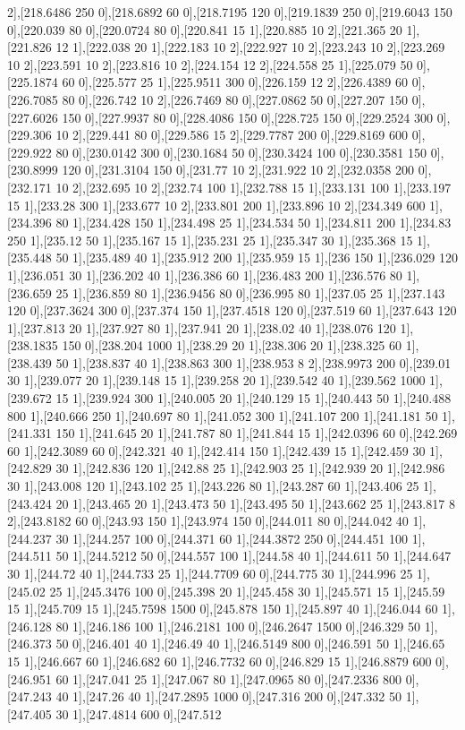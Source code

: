 {2],[218.6486 250 0],[218.6892 60 0],[218.7195 120 0],[219.1839 250 0],[219.6043 150 0],[220.039 80 0],[220.0724 80 0],[220.841 15 1],[220.885 10 2],[221.365 20 1],[221.826 12 1],[222.038 20 1],[222.183 10 2],[222.927 10 2],[223.243 10 2],[223.269 10 2],[223.591 10 2],[223.816 10 2],[224.154 12 2],[224.558 25 1],[225.079 50 0],[225.1874 60 0],[225.577 25 1],[225.9511 300 0],[226.159 12 2],[226.4389 60 0],[226.7085 80 0],[226.742 10 2],[226.7469 80 0],[227.0862 50 0],[227.207 150 0],[227.6026 150 0],[227.9937 80 0],[228.4086 150 0],[228.725 150 0],[229.2524 300 0],[229.306 10 2],[229.441 80 0],[229.586 15 2],[229.7787 200 0],[229.8169 600 0],[229.922 80 0],[230.0142 300 0],[230.1684 50 0],[230.3424 100 0],[230.3581 150 0],[230.8999 120 0],[231.3104 150 0],[231.77 10 2],[231.922 10 2],[232.0358 200 0],[232.171 10 2],[232.695 10 2],[232.74 100 1],[232.788 15 1],[233.131 100 1],[233.197 15 1],[233.28 300 1],[233.677 10 2],[233.801 200 1],[233.896 10 2],[234.349 600 1],[234.396 80 1],[234.428 150 1],[234.498 25 1],[234.534 50 1],[234.811 200 1],[234.83 250 1],[235.12 50 1],[235.167 15 1],[235.231 25 1],[235.347 30 1],[235.368 15 1],[235.448 50 1],[235.489 40 1],[235.912 200 1],[235.959 15 1],[236 150 1],[236.029 120 1],[236.051 30 1],[236.202 40 1],[236.386 60 1],[236.483 200 1],[236.576 80 1],[236.659 25 1],[236.859 80 1],[236.9456 80 0],[236.995 80 1],[237.05 25 1],[237.143 120 0],[237.3624 300 0],[237.374 150 1],[237.4518 120 0],[237.519 60 1],[237.643 120 1],[237.813 20 1],[237.927 80 1],[237.941 20 1],[238.02 40 1],[238.076 120 1],[238.1835 150 0],[238.204 1000 1],[238.29 20 1],[238.306 20 1],[238.325 60 1],[238.439 50 1],[238.837 40 1],[238.863 300 1],[238.953 8 2],[238.9973 200 0],[239.01 30 1],[239.077 20 1],[239.148 15 1],[239.258 20 1],[239.542 40 1],[239.562 1000 1],[239.672 15 1],[239.924 300 1],[240.005 20 1],[240.129 15 1],[240.443 50 1],[240.488 800 1],[240.666 250 1],[240.697 80 1],[241.052 300 1],[241.107 200 1],[241.181 50 1],[241.331 150 1],[241.645 20 1],[241.787 80 1],[241.844 15 1],[242.0396 60 0],[242.269 60 1],[242.3089 60 0],[242.321 40 1],[242.414 150 1],[242.439 15 1],[242.459 30 1],[242.829 30 1],[242.836 120 1],[242.88 25 1],[242.903 25 1],[242.939 20 1],[242.986 30 1],[243.008 120 1],[243.102 25 1],[243.226 80 1],[243.287 60 1],[243.406 25 1],[243.424 20 1],[243.465 20 1],[243.473 50 1],[243.495 50 1],[243.662 25 1],[243.817 8 2],[243.8182 60 0],[243.93 150 1],[243.974 150 0],[244.011 80 0],[244.042 40 1],[244.237 30 1],[244.257 100 0],[244.371 60 1],[244.3872 250 0],[244.451 100 1],[244.511 50 1],[244.5212 50 0],[244.557 100 1],[244.58 40 1],[244.611 50 1],[244.647 30 1],[244.72 40 1],[244.733 25 1],[244.7709 60 0],[244.775 30 1],[244.996 25 1],[245.02 25 1],[245.3476 100 0],[245.398 20 1],[245.458 30 1],[245.571 15 1],[245.59 15 1],[245.709 15 1],[245.7598 1500 0],[245.878 150 1],[245.897 40 1],[246.044 60 1],[246.128 80 1],[246.186 100 1],[246.2181 100 0],[246.2647 1500 0],[246.329 50 1],[246.373 50 0],[246.401 40 1],[246.49 40 1],[246.5149 800 0],[246.591 50 1],[246.65 15 1],[246.667 60 1],[246.682 60 1],[246.7732 60 0],[246.829 15 1],[246.8879 600 0],[246.951 60 1],[247.041 25 1],[247.067 80 1],[247.0965 80 0],[247.2336 800 0],[247.243 40 1],[247.26 40 1],[247.2895 1000 0],[247.316 200 0],[247.332 50 1],[247.405 30 1],[247.4814 600 0],[247.512 }
